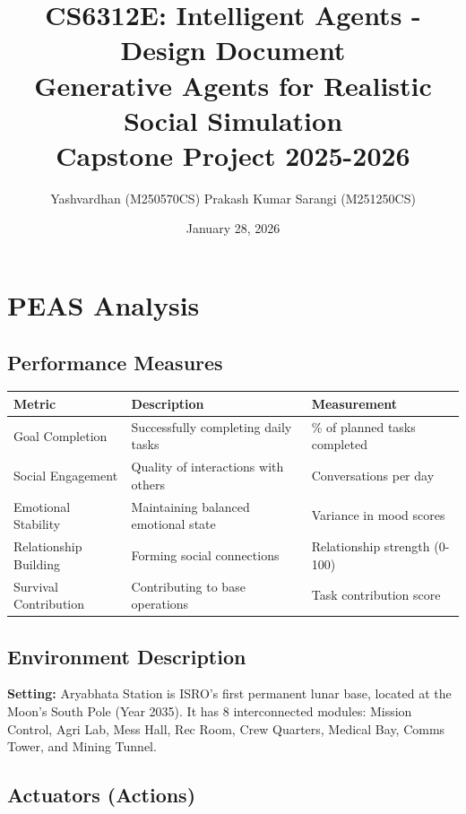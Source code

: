 \documentclass[12pt,a4paper]{article}
\title{
    \vspace{-2cm}
    \textbf{CS6312E: Intelligent Agents - Design Document}\\
    \large Generative Agents for Realistic Social Simulation\\
    \normalsize Capstone Project 2025-2026
}
\author{
    Yashvardhan (M250570CS) \quad Prakash Kumar Sarangi (M251250CS)
}
\date{January 28, 2026}
\begin{document}
\maketitle
\vspace{-0.8cm}

\section{PEAS Analysis}

\subsection{Performance Measures}

\begin{table}[H]
\centering
\small
\begin{tabular}{|l|l|l|}
\hline
\textbf{Metric} & \textbf{Description} & \textbf{Measurement} \\
\hline
Goal Completion & Successfully completing daily tasks & \% of planned tasks completed \\
Social Engagement & Quality of interactions with others & Conversations per day \\
Emotional Stability & Maintaining balanced emotional state & Variance in mood scores \\
Relationship Building & Forming social connections & Relationship strength (0-100) \\
Survival Contribution & Contributing to base operations & Task contribution score \\
\hline
\end{tabular}
\end{table}

\subsection{Environment Description}
\textbf{Setting:} Aryabhata Station is ISRO's first permanent lunar base, located at the Moon's South Pole (Year 2035). It has 8 interconnected modules: Mission Control, Agri Lab, Mess Hall, Rec Room, Crew Quarters, Medical Bay, Comms Tower, and Mining Tunnel.

\subsection{Actuators (Actions)}
\end{document}

